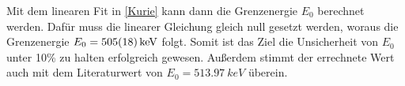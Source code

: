 Mit dem linearen Fit in \cref{Kurie} kann dann die Grenzenergie $E_{0}$ berechnet werden. Dafür muss die linearer Gleichung gleich null gesetzt werden, woraus die Grenzenergie $E_{0} = \SI{505 \pm 18}{keV}$ folgt. Somit ist das Ziel die Unsicherheit von $E_{0}$ unter 10\% zu halten erfolgreich gewesen. Außerdem stimmt der errechnete Wert auch mit dem Literaturwert von $E_{0} =\SI{513,97}{keV}$ \autocite{Zerfallsreihe}  überein.